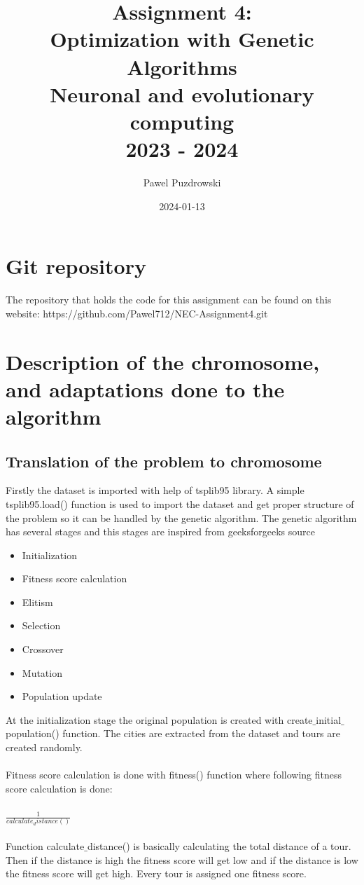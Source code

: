 \documentclass[12pt]{report}
\title{Assignment 4: \\ Optimization with Genetic Algorithms \\ Neuronal and evolutionary computing\\ 2023 - 2024}
\author{Pawel Puzdrowski}
\date{2024-01-13}
\begin{document}
    \maketitle
    \tableofcontents
    \newpage
    \section{Git repository}
    The repository that holds the code for this assignment can be found on this website: https://github.com/Pawel712/NEC-Assignment4.git
    \section{Description of the chromosome, and adaptations done to the algorithm}
    \subsection{Translation of the problem to chromosome}
    Firstly the dataset is imported with help of tsplib95 library. A simple tsplib95.load() function is used to import the dataset and get proper structure of the problem so it can be handled by the genetic algorithm. The genetic algorithm has several stages and this stages are inspired from geeksforgeeks source \cite{TSPGeeksforgeeks}
    \begin{itemize}
        \item Initialization 
        \item Fitness score calculation
        \item Elitism 
        \item Selection 
        \item Crossover 
        \item Mutation 
        \item Population update 
    \end{itemize}
    At the initialization stage the original population is created with create$\_$initial$\_$population() function. The cities are extracted from the dataset and tours are created randomly. \\
    \\
    Fitness score calculation is done with fitness() function where following fitness score calculation is done:\\
    \\
    $\frac{1}{calculate_distance()}$\\
    \\
    Function calculate$\_$distance() is basically calculating the total distance of a tour. Then if the distance is high the fitness score will get low and if the distance is low the fitness score will get high. Every tour is assigned one fitness score. \\
\end{document}
